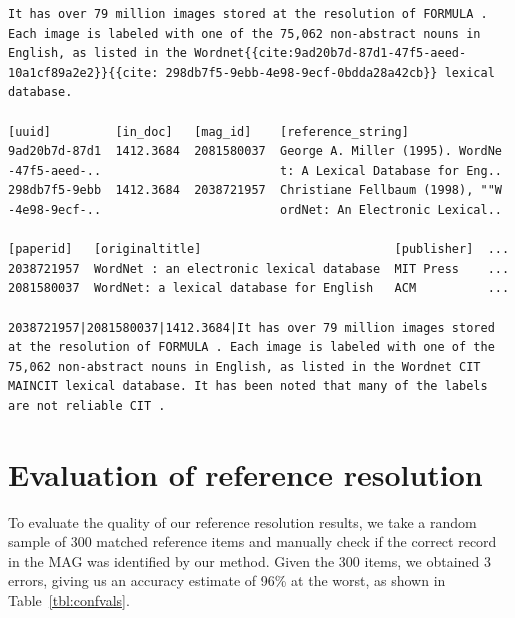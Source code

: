 \begin{lstlisting}[caption={Excerpts from (top to bottom) a plain text file, corresponding data base entries in the references DB, entries in the MAG and extracted citation context CSV.},label={lst:formatall}]
It has over 79 million images stored at the resolution of FORMULA . Each image is labeled with one of the 75,062 non-abstract nouns in English, as listed in the Wordnet{{cite:9ad20b7d-87d1-47f5-aeed-10a1cf89a2e2}}{{cite: 298db7f5-9ebb-4e98-9ecf-0bdda28a42cb}} lexical database.

[uuid]         [in_doc]   [mag_id]    [reference_string]
9ad20b7d-87d1  1412.3684  2081580037  George A. Miller (1995). WordNe
-47f5-aeed-..                         t: A Lexical Database for Eng..
298db7f5-9ebb  1412.3684  2038721957  Christiane Fellbaum (1998), ""W
-4e98-9ecf-..                         ordNet: An Electronic Lexical..

[paperid]   [originaltitle]                           [publisher]  ...
2038721957  WordNet : an electronic lexical database  MIT Press    ...
2081580037  WordNet: a lexical database for English   ACM          ...

2038721957|2081580037|1412.3684|It has over 79 million images stored at the resolution of FORMULA . Each image is labeled with one of the 75,062 non-abstract nouns in English, as listed in the Wordnet CIT MAINCIT lexical database. It has been noted that many of the labels are not reliable CIT .
\end{lstlisting}

\section{Evaluation of reference resolution}
To evaluate the quality of our reference resolution results, we take a random sample of 300 matched reference items and manually check if the correct record in the MAG was identified by our method. Given the 300 items, we obtained 3 errors, giving us an accuracy estimate of 96\% at the worst, as shown in Table~\ref{tbl:confvals}.


